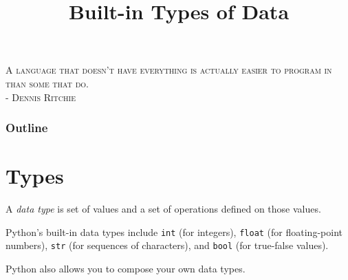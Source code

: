 \documentclass[8pt,a4paper,compress,handout]{beamer}
\title{Built-in Types of Data}
\date{}
\begin{document}
\begin{frame}
\begin{flushright}
\tiny \textsc{A language that doesn't have everything is actually easier to program in than some that do. \\ - Dennis Ritchie}
\end{flushright}
\titlepage
\end{frame}

\begin{frame}
\frametitle{Outline}
\tableofcontents
\end{frame}

\section{Types}
\begin{frame}[fragile]
A \emph{data type} is set of values and a set of operations defined on those values.

\bigskip

Python's built-in data types include \lstinline{int} (for integers), \lstinline{float} (for floating-point numbers), \lstinline{str} (for sequences of characters), and \lstinline{bool} (for true-false values).

\bigskip

Python also allows you to compose your own data types.
\end{frame}
\end{document}
